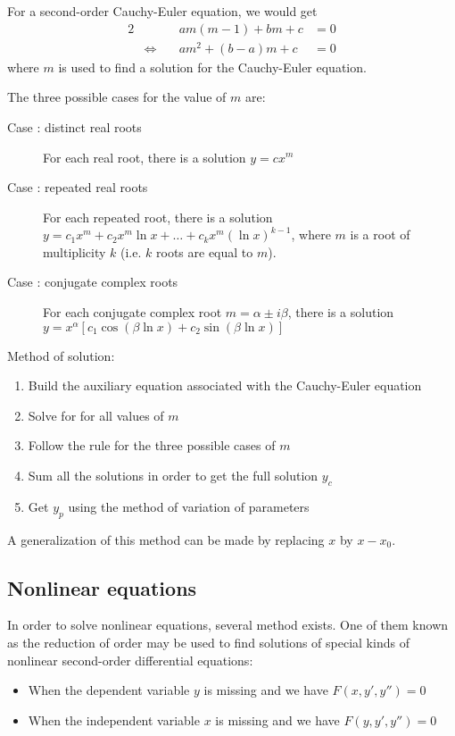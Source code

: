 \documentclass[10pt, twocolumn]{article}
\theoremstyle{definition}
\begin{document}
\begin{example}
  For a second-order Cauchy-Euler equation, we would get
  \begin{alignat*}{2}
     &                           & am(m - 1) + bm + c  & = 0 \\
     & \Longleftrightarrow \quad & am^2 + (b - a)m + c & = 0
  \end{alignat*}
  where \(m\) is used to find a solution for the Cauchy-Euler equation.
\end{example}

The three possible cases for the value of \(m\) are:
\begin{description}
  \item[Case : distinct real roots] For each real root, there is a solution \(y = cx^m \)
  \item[Case : repeated real roots] For each repeated root, there is a solution \(y = c_1 x^m + c_2 x^m \ln{x} + \dots + c_k x^m (\ln{x})^{k-1}\), where \(m\) is a root of multiplicity \(k\) (i.e. \(k\) roots are equal to \(m\)).
  \item[Case : conjugate complex roots] For each conjugate complex root \(m = \alpha \pm i\beta\), there is a solution \(y = x^{\alpha}\left[ c_1 \cos(\beta\ln{x}) + c_2 \sin(\beta\ln{x}) \right]\)
\end{description}

Method of solution:
\begin{enumerate}
  \item Build the auxiliary equation associated with the Cauchy-Euler equation
  \item Solve for for all values of \(m\)
  \item Follow the rule for the three possible cases of \(m\)
  \item Sum all the solutions in order to get the full solution \(y_c \)
  \item Get \(y_p \) using the method of variation of parameters
\end{enumerate}

A generalization of this method can be made by replacing \(x\) by \(x - x_0 \).


\subsection{Nonlinear equations}
In order to solve nonlinear equations, several method exists.
One of them known as the reduction of order may be used to find solutions of special kinds of nonlinear second-order differential equations:
\begin{itemize}
  \item When the dependent variable \(y\) is missing and we have \(F(x, y', y'') = 0\)
  \item When the independent variable \(x\) is missing and we have \(F(y, y', y'') = 0\)
\end{itemize}
\end{document}
